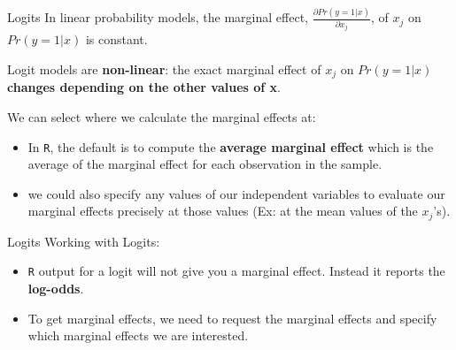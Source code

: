 \documentclass[
  ignorenonframetext,
]{beamer}
\begin{document}
\begin{frame}[fragile]{Logits}
\protect\hypertarget{logits-4}{}
In linear probability models, the marginal effect,
\(\frac{\partial Pr(y=1|x)}{\partial x_j}\), of \(x_j\) on \(Pr(y=1|x)\)
is constant.

Logit models are \textbf{non-linear}: the exact marginal effect of
\(x_j\) on \(Pr(y=1|x)\) \textbf{changes depending on the other values
of x}.

We can select where we calculate the marginal effects at:

\begin{itemize}
\item
  In \texttt{R}, the default is to compute the \textbf{average marginal
  effect} which is the average of the marginal effect for each
  observation in the sample.
\item
  we could also specify any values of our independent variables to
  evaluate our marginal effects precisely at those values (Ex: at the
  mean values of the \(x_j\)'s).
\end{itemize}
\end{frame}

\begin{frame}[fragile]{Logits}
\protect\hypertarget{logits-5}{}
Working with Logits:

\begin{itemize}
\item
  \texttt{R} output for a logit will not give you a marginal effect.
  Instead it reports the \textbf{log-odds}.
\item
  To get marginal effects, we need to request the marginal effects and
  specify which marginal effects we are interested.
\end{itemize}
\end{frame}
\end{document}
